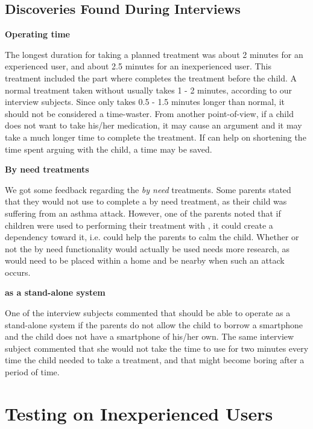 \subsection{Discoveries Found During Interviews}

\textbf{Operating time}

The longest duration for taking a planned treatment was about 2 minutes for an experienced user, and about 2.5 minutes for an inexperienced user. This treatment included the part where \buddy{} completes the treatment before the child. A normal treatment taken without \ab{} usually takes 1 - 2 minutes, according to our interview subjects. Since \ab{} only takes 0.5 - 1.5 minutes longer than normal, it should not be considered a time-waster. From another point-of-view, if a child does not want to take his/her medication, it may cause an argument and it may take a much longer time to complete the treatment. If \ab{} can help on shortening the time spent arguing with the child, a time may be saved.      

\clearpage{}
\textbf{By need treatments}

We got some feedback regarding the \emph{by need} treatments. Some parents stated that they would not use \buddy{} to complete a by need treatment, as their child was suffering from an asthma attack. However, one of the parents noted that if children were used to performing their treatment with \buddy{}, it could create a dependency toward it, i.e. \buddy{} could help the parents to calm the child. Whether or not the by need functionality would actually be used needs more research, as \buddy{} would need to be placed within a home and be nearby when such an attack occurs. 

\textbf{\ab{} as a stand-alone system}

One of the interview subjects commented that \ab{} should be able to operate as a stand-alone system if the parents do not allow the child to borrow a smartphone and the child does not have a smartphone of his/her own. The same interview subject commented that she would not take the time to use \ab{} for two minutes every time the child needed to take a treatment, and that \ab{} might become boring after a period of time.

\section{Testing \ab{} on Inexperienced Users}
\label{chp:interaction-methods}

